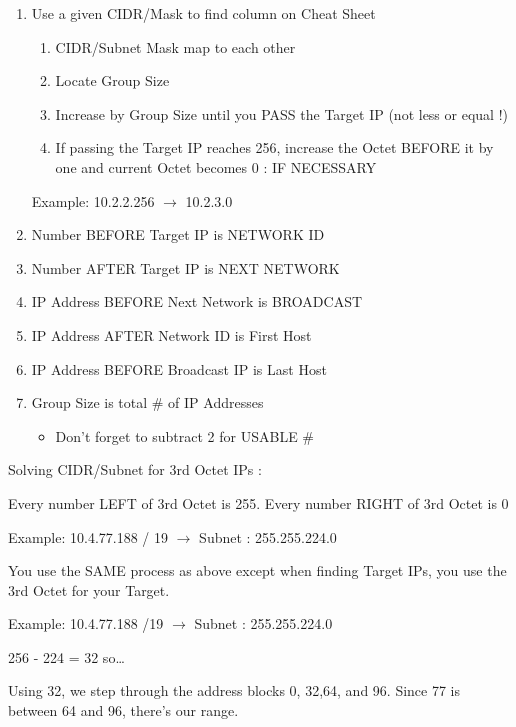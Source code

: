 \begin{enumerate}
\def\labelenumi{\arabic{enumi}.}
\item
  Use a given CIDR/Mask to find column on Cheat Sheet

  \begin{enumerate}
  \def\labelenumii{\alph{enumii})}
  \item
    CIDR/Subnet Mask map to each other
  \item
    Locate Group Size
  \item
    Increase by Group Size until you PASS the Target IP (not less or
    equal !)
  \item
    If passing the Target IP reaches 256, increase the Octet BEFORE it
    by one and current Octet becomes 0 : IF NECESSARY
  \end{enumerate}

  Example: 10.2.2.256 \(\rightarrow\) 10.2.3.0
\item
  Number BEFORE Target IP is NETWORK ID
\item
  Number AFTER Target IP is NEXT NETWORK
\item
  IP Address BEFORE Next Network is BROADCAST
\item
  IP Address AFTER Network ID is First Host
\item
  IP Address BEFORE Broadcast IP is Last Host
\item
  Group Size is total \# of IP Addresses

  \begin{itemize}
  \tightlist
  \item
    Don't forget to subtract 2 for USABLE \#
  \end{itemize}
\end{enumerate}

Solving CIDR/Subnet for 3rd Octet IPs :

Every number LEFT of 3rd Octet is 255. Every number RIGHT of 3rd Octet
is 0

Example: 10.4.77.188 / 19 \(\rightarrow\) Subnet : 255.255.224.0

You use the SAME process as above except when finding Target IPs, you
use the 3rd Octet for your Target.

Example: 10.4.77.188 /19 \(\rightarrow\) Subnet : 255.255.224.0

256 - 224 = 32 so\ldots{}

Using 32, we step through the address blocks 0, 32,64, and 96. Since 77
is between 64 and 96, there's our range.

